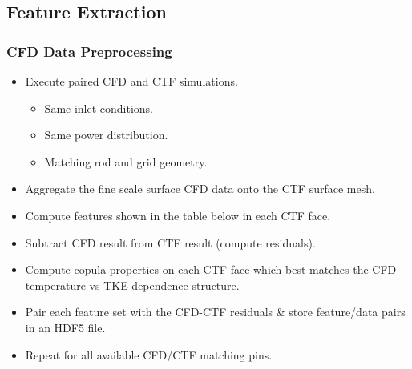\documentclass[t, pdftex]{beamer}
\begin{document}
\subsection*{Feature Extraction}
\begin{frame}[shrink=20]
\frametitle{CFD Data Preprocessing}
\vspace{-20pt}
\begin{itemize}
    \item Execute paired CFD and CTF simulations.
    \begin{itemize}
        \item Same inlet conditions.
        \item Same power distribution.
        \item Matching rod and grid geometry.
    \end{itemize}
    \item Aggregate the fine scale surface CFD data onto the CTF surface mesh.
    \item Compute features shown in the table below in each CTF face.
    \item Subtract CFD result from CTF result (compute residuals).
    \item Compute copula properties on each CTF face which best matches the CFD temperature vs TKE dependence structure.
    \item Pair each feature set with the CFD-CTF residuals \& store feature/data pairs in an HDF5 file.
    \item Repeat for all available CFD/CTF matching pins.
\end{itemize}
\vspace{-20pt}
\begin{table}[h]
    \begin{center}
        

\end{center}
\end{table}
\end{frame}
\end{document}

